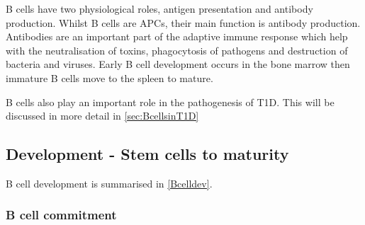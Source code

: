 B cells have two physiological roles, antigen presentation and antibody production.
Whilst B cells are APCs, their main function is antibody production.
Antibodies are an important part of the adaptive immune response which help with the neutralisation of toxins, phagocytosis of pathogens and destruction of bacteria and viruses.
Early B cell development occurs in the bone marrow then immature B cells move to the spleen to mature.

B cells also play an important role in the pathogenesis of T1D. 
This will be discussed in more detail in \cref{sec:BcellsinT1D}

\subsection{Development - Stem cells to maturity}
\label{subsec:Bcelldevelopment}

B cell development is summarised in \cref{Bcelldev}.
\subsubsection{B cell commitment}





